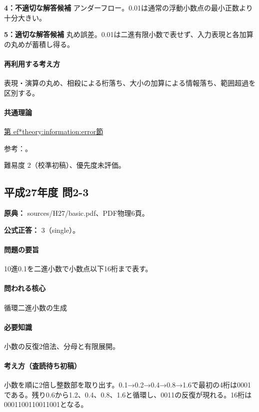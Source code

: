 \noindent\textbf{4：不適切な解答候補} アンダーフロー。0.01は通常の浮動小数点の最小正数より十分大きい。\par

\noindent\textbf{5：適切な解答候補} 丸め誤差。0.01は二進有限小数で表せず、入力表現と各加算の丸めが蓄積し得る。\par

\paragraph{再利用する考え方} 表現・演算の丸め、相殺による桁落ち、大小の加算による情報落ち、範囲超過を区別する。

\paragraph{共通理論} \hyperref[theory:information:error]{第
ef*{theory:information:error}節}

\par 参考：\cite{goldberg1991}。

\par 難易度 2（校準初稿）、優先度未評価。

\subsection{平成27年度 問2-3}
\label{q:h27-reg-basic-2-3}

\noindent\textbf{原典：} sources/H27/basic.pdf、PDF物理6頁。

\textbf{公式正答：} 3（single）。

\paragraph{問題の要旨} 10進0.1を二進小数で小数点以下16桁まで表す。

\paragraph{問われる核心} 循環二進小数の生成

\paragraph{必要知識} 小数の反復2倍法、分母と有限展開。

\paragraph{考え方（査読待ち初稿）} 小数を順に2倍し整数部を取り出す。0.1→0.2→0.4→0.8→1.6で最初の4桁は0001である。残り0.6から1.2、0.4、0.8、1.6と循環し、0011の反復が現れる。16桁は0001100110011001となる。


